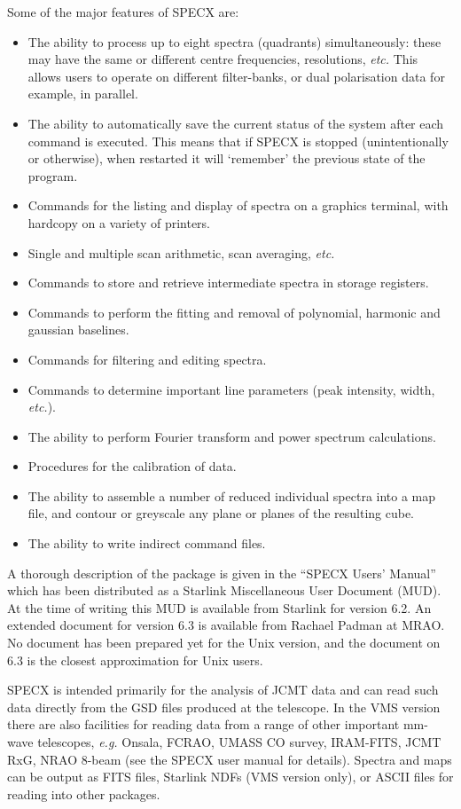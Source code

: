 Some of the major features of SPECX are:
\begin{itemize}
\item
The ability to process up to eight spectra (quadrants) simultaneously:
these may have the same or different centre frequencies, resolutions, 
{\em etc.} This allows users to operate on different filter-banks, or
dual polarisation data for example, in parallel. 
\item
The ability to automatically save the current status of the system 
after each command is executed. This means that if SPECX is
stopped (unintentionally or otherwise), when restarted it will
`remember' the previous state of the program.
\item
Commands for the listing and display of spectra on a graphics
terminal, with hardcopy on a variety of printers.
\item
Single and multiple scan arithmetic, scan averaging, {\em etc.}
\item
Commands to store and retrieve intermediate spectra in storage registers.
\item
Commands to perform the fitting and removal of polynomial, 
harmonic and gaussian baselines.
\item
Commands for filtering and editing spectra.
\item
Commands to determine important line parameters (peak intensity, width, 
{\em etc.}).
\item
The ability to perform Fourier transform and power spectrum calculations.
\item
Procedures for the calibration of data.
\item
The ability to assemble a number of reduced individual spectra into a 
map file, and contour or greyscale any plane or planes of the resulting cube.
\item
The ability to write indirect command files.
\end{itemize}

A thorough description of the package is given in the ``SPECX Users' Manual''
which has been distributed as a Starlink Miscellaneous User Document
(MUD). At the time of writing this MUD is available from Starlink for
version 6.2. An extended document for version 6.3 is available from
Rachael Padman at MRAO. No document has been prepared yet for the Unix
version, and the document on 6.3 is the closest approximation for Unix
users.

SPECX is intended primarily for the analysis of JCMT data and can read
such data directly from the GSD files produced at the
telescope.
In the VMS version there are also facilities for reading data from a
range of other important mm-wave telescopes, {\em e.g.} Onsala,
FCRAO, UMASS CO survey, IRAM-FITS, JCMT RxG, NRAO 8-beam (see 
the SPECX user manual for details). 
Spectra and maps can be output as FITS files,
Starlink NDFs (VMS version only), or ASCII files for reading into other
packages.


